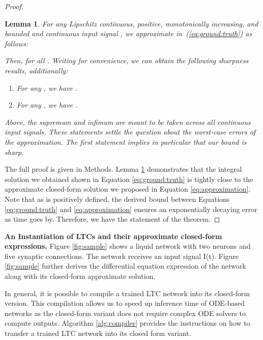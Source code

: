 \documentclass[12pt]{article}
\newtheorem{lemma}{Lemma}
\begin{document}
\begin{proof}
\begin{lemma}\label{lemma:approx}
For any Lipschitz continuous, positive, monotonically increasing, and bounded  and continuous input signal , we approximate  in~(\ref{eq:ground:truth}) as follows:

Then,  for all . Writing  for convenience, we can obtain the following sharpness results, additionally:
\begin{enumerate}
    \item For any , we have .
    \item For any , we have .
\end{enumerate}
Above, the supremum and infimum are meant to be taken across all continuous input signals. These statements settle the question about the worst-case errors of the approximation. The first statement implies in particular that our bound is sharp.
\end{lemma}

\noindent The full proof is given in Methods. Lemma \ref{lemma:approx} demonstrates that the integral solution we obtained shown in Equation \ref{eq:ground:truth} is tightly close to the approximate closed-form solution we proposed in Equation \ref{eq:approximation}. Note that as  is positively defined, the derived bound between Equations \ref{eq:ground:truth} and \ref{eq:approximation} ensures an exponentially decaying error as time goes by. 
\noindent Therefore, we have the statement of the theorem. 
\end{proof}

\noindent \textbf{An Instantiation of LTCs and their approximate closed-form expressions.} 
Figure \ref{fig:sample} shows a liquid network with two neurons and five synaptic connections. The network receives an input signal I(t). Figure \ref{fig:sample} further derives the differential equation expression of the network along with its closed-form approximate solution. 

In general, it is possible to compile a trained LTC network into its closed-form version. This compilation allows us to speed up inference time of ODE-based networks as the closed-form variant does not require complex ODE solvers to compute outputs. Algorithm \ref{alg:compiler} provides the instructions on how to transfer a trained LTC network into its closed form variant.
\end{document}
